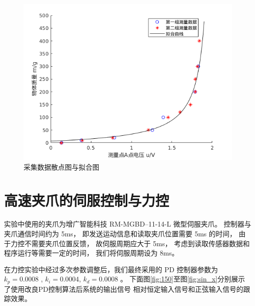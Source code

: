 \begin{figure}[!ht]
  \centering
  \includegraphics[width=13.5cm]{chapter04/pic/4-4}
  \caption{采集数据散点图与拟合图}
  \label{fig:4-4}
  \vspace{-0.3cm}
\end{figure}

\section{高速夹爪的伺服控制与力控}
实验中使用的夹爪为增广智能科技 RM-MGBD--11-14-L 微型伺服夹爪。
控制器与夹爪通信时间约为 5ms， 即发送运动信息和读取夹爪位置需要 5ms 的时间，
由于力控不需要夹爪位置反馈， 故伺服周期应大于 5ms，
考虑到读取传感器数据和程序运行等需要一定的时间， 我们将伺服周期设为 8ms。

在力控实验中经过多次参数调整后，我们最终采用的 PD 控制器参数为
$k_p = 0.0008$ , $k_i = 0.0004$, $k_d = 0.0008$ 。
下面图\ref{fig:150}至图\ref{fig:sin_x}分别展示了使用改良PD控制算法后系统的输出信号
相对恒定输入信号和正弦输入信号的跟踪效果。




